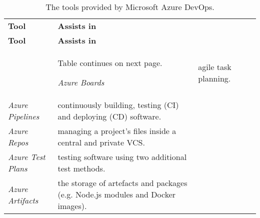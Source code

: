 \begin{longtable}{lXXX}
\label{tab:azure_devops}
\vspace{0.25cm}\\
\toprule
\textbf{Tool} & \textbf{Assists in} \\ 
\midrule
\endfirsthead
\toprule
\textbf{Tool} & \textbf{Assists in} \\ 
\midrule
\endhead
\midrule
& \hspace*{\fill} \small{Table continues on next page.}
\endfoot
\bottomrule
\caption[The tools provided by Microsoft Azure DevOps.]{The tools provided by Microsoft Azure DevOps.}
\endlastfoot
\textit{Azure Boards} & agile task planning.\\
\textit{Azure Pipelines} & continuously building, testing (\ac{CI}) and deploying (\ac{CD}) software.\\
\textit{Azure Repos} & managing a project's files inside a central and private \ac{VCS}.\\
\textit{Azure Test Plans} & testing software using two additional test methods.\\
\textit{Azure Artifacts} & the storage of artefacts and packages (e.g. Node.js modules and Docker images).\\
\end{longtable}
